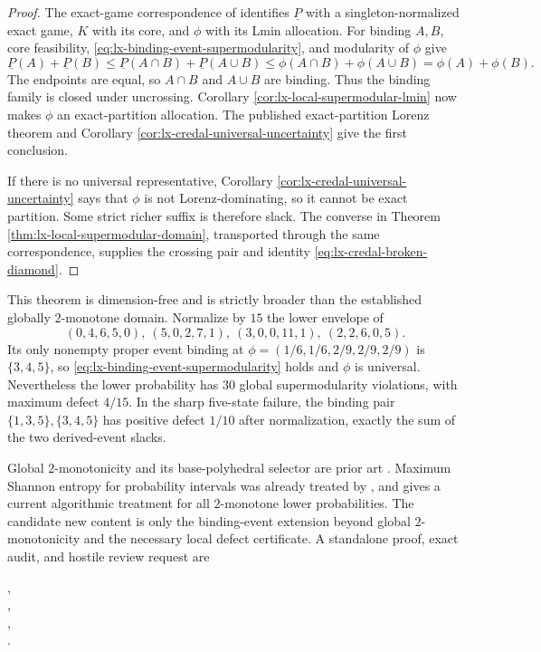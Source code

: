 \begin{proof}
The exact-game correspondence of \citet{StudenyKratochvil2017} identifies
$\underline P$ with a singleton-normalized exact game, $K$ with its core,
and $\phi$ with its Lmin allocation.  For binding $A,B$, core feasibility,
\eqref{eq:lx-binding-event-supermodularity}, and modularity of $\phi$ give
\[
 \underline P(A)+\underline P(B)
 \leq\underline P(A\cap B)+\underline P(A\cup B)
 \leq\phi(A\cap B)+\phi(A\cup B)
 =\phi(A)+\phi(B).
\]
The endpoints are equal, so $A\cap B$ and $A\cup B$ are binding.  Thus the
binding family is closed under uncrossing.  Corollary
\ref{cor:lx-local-supermodular-lmin} now makes $\phi$ an exact-partition
allocation.  The published exact-partition Lorenz theorem and Corollary
\ref{cor:lx-credal-universal-uncertainty} give the first conclusion.

If there is no universal representative, Corollary
\ref{cor:lx-credal-universal-uncertainty} says that $\phi$ is not
Lorenz-dominating, so it cannot be exact partition.  Some strict richer
suffix is therefore slack.  The converse in Theorem
\ref{thm:lx-local-supermodular-domain}, transported through the same
correspondence, supplies the crossing pair and identity
\eqref{eq:lx-credal-broken-diamond}.
\end{proof}

This theorem is dimension-free and is strictly broader than the established
globally $2$-monotone domain.  Normalize by $15$ the lower envelope of
\[
 (0,4,6,5,0),\ (5,0,2,7,1),\ (3,0,0,11,1),\ (2,2,6,0,5).
\]
Its only nonempty proper event binding at
$\phi=(1/6,1/6,2/9,2/9,2/9)$ is $\{3,4,5\}$, so
\eqref{eq:lx-binding-event-supermodularity} holds and $\phi$ is universal.
Nevertheless the lower probability has $30$ global supermodularity
violations, with maximum defect $4/15$.  In the sharp five-state failure,
the binding pair $\{1,3,5\},\{3,4,5\}$ has positive defect $1/10$ after
normalization, exactly the sum of the two derived-event slacks.

Global $2$-monotonicity and its base-polyhedral selector are prior art
\citep{Fujishige1980,FrankMurota2022}.  Maximum Shannon entropy for
probability intervals was already treated by \citet{AbellanMoral2003}, and
\citet{VuDesterckePichon2026} gives a current algorithmic treatment for all
$2$-monotone lower probabilities.  The candidate new content is only the
binding-event extension beyond global $2$-monotonicity and the necessary
local defect certificate.  A standalone proof, exact audit, and hostile
review request are
\begin{center}
\small{},\\[-2pt]
\small{},\\[-2pt]
\small{},\\[-2pt]
\small{}.
\end{center}

